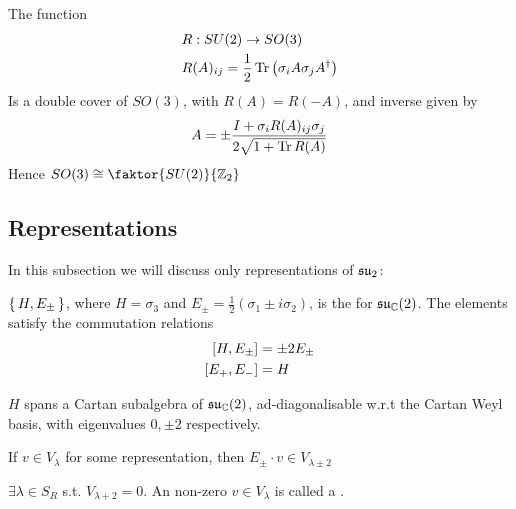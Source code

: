 \documentclass{article}
\begin{document}
\begin{fact}
	The function 
	\begin{align*}
		& R : SU(2) \to SO(3) \\
		& R(A)_{ij} = \frac{1}{2}\tr\left( \sigma_i A \sigma_j A^\dagger \right)
	\end{align*}
	Is a double cover of $SO(3)$, with $R(A)=R(-A)$, and inverse given by 
	\[
	A=\pm \frac{I+\sigma_i R(A)_{ij} \sigma_j}{2\sqrt{1+\tr R(A)}}
	\]
	Hence $SO(3)\cong\faktor{SU(2)}{\mbb{Z}_2}$
\end{fact}

\subsection{Representations}

In this subsection we will discuss only representations of $\mf{su}_2$:

\begin{definition}
	$\set{  H, E_\pm  }$, where $H=\sigma_3$ and $E_\pm=\frac{1}{2}(\sigma_1\pm i\sigma_2 )$, is the  for $\mf{su}_\mbb{C}(2)$. The elements satisfy the commutation relations 
	\begin{align*}
		\comm[H]{E_\pm} &= \pm 2E_\pm \\
		\comm[E_+]{E_-} &= H
	\end{align*}
\end{definition} 

\begin{fact}
	$H$ spans a Cartan subalgebra of $\mf{su}_\mbb{C}(2)$, ad-diagonalisable w.r.t the Cartan Weyl basis, with eigenvalues $0, \pm 2$ respectively. 
\end{fact}

\begin{lemma}
	If $v \in V_\lambda$ for some representation, then $E_\pm \cdot v \in V_{\lambda\pm 2}$
\end{lemma}
\begin{corollary}
	$\exists \lambda \in S_R$ s.t. $V_{\lambda+2}=0$. An non-zero $v\in V_\lambda$ is called a . 
\end{corollary}
\end{document}
